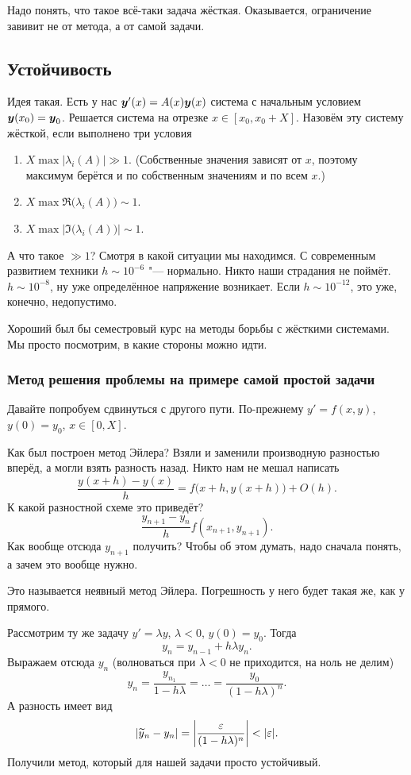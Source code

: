Надо понять, что такое всё-таки задача жёсткая. Оказывается, ограничение завивит не от метода, а от самой задачи.
\subsection{Устойчивость}
Идея такая. Есть у нас $\boldsymbol{y}'(x) = A(x) \boldsymbol{y}(x)$ система с начальным условием $\boldsymbol{y}(x_0) = \boldsymbol{y}_0$. Решается система на отрезке $x\in[x_0,x_0+X]$. Назовём эту систему жёсткой, если выполнено три условия
\begin{enumerate}
\item $X\max\big|\lambda_i(A)\big|\gg 1$. (Собственные значения зависят от $x$, поэтому максимум берётся и по собственным значениям и по всем $x$.)
\item $X\max \Re\big(\lambda_i(A)\big)\sim 1$.
\item $X\max \Big|\Im\big(\lambda_i(A)\big)\Big|\sim 1$.
\end{enumerate}

А что такое $\gg1$? Смотря в какой ситуации мы находимся. С современным развитием техники $h\sim 10^{-6}$ "--- нормально. Никто наши страдания не поймёт. $h\sim 10^{-8}$, ну уже определённое напряжение возникает. Если $h\sim 10^{-12}$, это уже, конечно, недопустимо.

Хороший был бы семестровый курс на методы борьбы с жёсткими системами. Мы просто посмотрим, в какие стороны можно идти.
\subsubsection{Метод решения проблемы на примере самой простой задачи}
Давайте попробуем сдвинуться с другого пути. По-прежнему $y' = f(x,y)$, $y(0) = y_0$, $x\in[0,X]$.

Как был построен метод Эйлера? Взяли и заменили производную разностью вперёд, а могли взять разность назад. Никто нам не мешал написать
\[
  \frac{y(x+h) - y(x)}{h} = f\big(x+h,y(x+h)\big) + O(h).
\]
К какой разностной схеме это приведёт?
\[
  \frac{y_{n+1} - y_n}{h}f(x_{n+1},y_{n+1}).
\]
Как вообще отсюда $y_{n+1}$ получить? Чтобы об этом думать, надо сначала понять, а зачем это вообще нужно.

Это называется неявный метод Эйлера. Погрешность у него будет такая же, как у прямого.

Рассмотрим ту же задачу $y' = \lambda y$, $\lambda <0$, $y(0) = y_0$. Тогда
\[
  y_n = y_{n-1} + h \lambda y_n.
\]
Выражаем отсюда $y_n$ (волноваться при $\lambda<0$ не приходится, на ноль не делим)
\[
  y_n = \frac{y_{n_1}}{1- h\lambda} = \dots = \frac{y_0}{(1-h\lambda)^n}.
\]
А разность имеет вид
\[
  |\widetilde{y}{}_n - y_n| = \left|\frac{\varepsilon}{(1-h\lambda)^n} \right| < |\varepsilon|.
\]
Получили метод, который для нашей задачи просто устойчивый.

